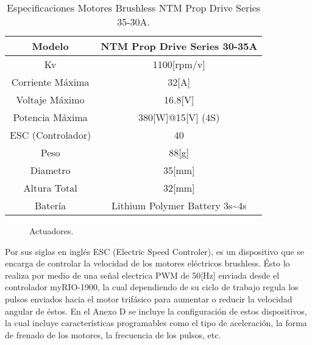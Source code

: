 \documentclass[../main.tex]{subfiles}
\begin{document}
\begin{table}[H]
\noindent \begin{centering}
\begin{tabular}{|c|c|}
\hline 
\multicolumn{1}{|c}{Modelo } & NTM Prop Drive Series 30-35A\tabularnewline
\hline 
\hline 
Kv & 1100{[}rpm/v{]}\tabularnewline
\hline 
Corriente Máxima & 32{[}A{]}\tabularnewline
\hline 
Voltaje Máximo & 16.8{[}V{]}\tabularnewline
\hline 
Potencia Máxima & 380{[}W{]}@15{[}V{]} (4S)\tabularnewline
\hline 
ESC (Controlador) & 40\tabularnewline
\hline 
Peso & 88{[}g{]}\tabularnewline
\hline 
Diametro & 35{[}mm{]}\tabularnewline
\hline 
Altura Total & 32{[}mm{]}\tabularnewline
\hline 
Batería & Lithium Polymer Battery 3s\textasciitilde{}4s\tabularnewline
\hline 
\end{tabular}
\par\end{centering}
\caption{Especificaciones Motores Brushless NTM Prop Drive Series 35-30A.}
\end{table}

\begin{figure}[H]
\noindent \begin{centering}
\par\end{centering}
\caption{Actuadores.}
\end{figure}


Por sus siglas en inglés ESC (Electric Speed Controler), es un dispositivo
que se encarga de controlar la velocidad de los motores eléctricos brushless. Ésto lo realiza por medio de una señal electrica PWM de
50{[}Hz{]} enviada desde el controlador myRIO-1900, la cual dependiendo
de su ciclo de trabajo regula los pulsos enviados hacia el motor trifásico
para aumentar o reducir la velocidad angular de éstos. En el Anexo D
se incluye la configuración de estos dispositivos, la cual incluye
características programables como el tipo de aceleración, la forma
de frenado de los motores, la frecuencia de los pulsos, etc.
\end{document}
